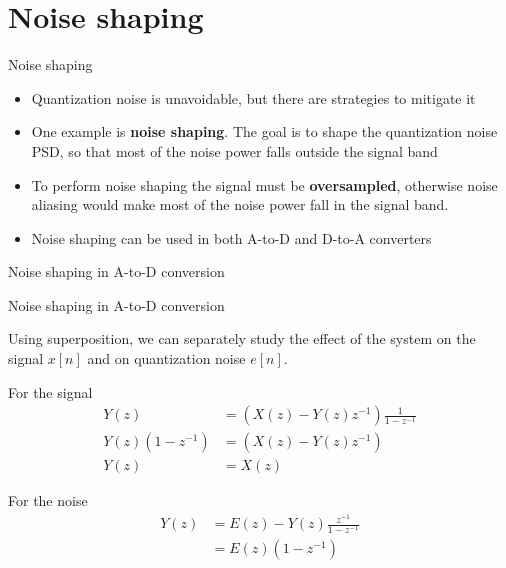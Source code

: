 \documentclass[10pt]{beamer}
\begin{document}
\section{Noise shaping}
\begin{frame}{Noise shaping}

\begin{itemize}
	\item Quantization noise is unavoidable, but there are strategies to mitigate it
	\item One example is \textbf{noise shaping}. The goal is to shape the quantization noise PSD, so that most of the noise power falls outside the signal band
	\item To perform noise shaping the signal must be \textbf{oversampled}, otherwise noise aliasing would make most of the noise power fall in the signal band.
	\item Noise shaping can be used in both A-to-D and D-to-A converters
\end{itemize}
\end{frame}

\begin{frame}{Noise shaping in A-to-D conversion}
\begin{center}
	\def\ALL{1}
	\resizebox{0.8\textwidth}{!}{}
\end{center}
\end{frame}

%
\begin{frame}{Noise shaping in A-to-D conversion}
\vspace{-0.3cm}
\begin{center}
	\let\ALL\undefined
	\resizebox{0.6\textwidth}{!}{}
\end{center}

Using superposition, we can separately study the effect of the system on the signal $x[n]$ and on quantization noise $e[n]$. 

For the signal
\begin{align*}
Y(z) &= (X(z) - Y(z)z^{-1})\frac{1}{1 - z^{-1}} \\
Y(z)(1 - z^{-1}) &= (X(z) - Y(z)z^{-1}) \\
Y(z) &= X(z) \tag{signal is unaffected}
\end{align*}

For the noise
\begin{align*}
Y(z) &= E(z) - Y(z)\frac{z^{-1}}{1 - z^{-1}} \\
&= E(z)(1 - z^{-1}) \tag{noise is filtered}
\end{align*}
\end{frame}
\end{document}
